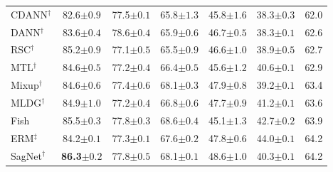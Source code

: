 \begin{table}
\begin{tabular}{l|ccccc|c}
CDANN$^\dagger$ \cite{li2018cdann}              & 82.6\scriptsize{$\pm0.9$}          & 77.5\scriptsize{$\pm0.1$}          & 65.8\scriptsize{$\pm1.3$}          & 45.8\scriptsize{$\pm1.6$}          & 38.3\scriptsize{$\pm0.3$}          & 62.0           \\
DANN$^\dagger$ \cite{ganin2016dann}             & 83.6\scriptsize{$\pm0.4$}          & 78.6\scriptsize{$\pm0.4$}          & 65.9\scriptsize{$\pm0.6$}          & 46.7\scriptsize{$\pm0.5$}          & 38.3\scriptsize{$\pm0.1$}          & 62.6           \\
RSC$^\dagger$ \cite{huang2020rsc}               & 85.2\scriptsize{$\pm0.9$}          & 77.1\scriptsize{$\pm0.5$}          & 65.5\scriptsize{$\pm0.9$}          & 46.6\scriptsize{$\pm1.0$}          & 38.9\scriptsize{$\pm0.5$}          & 62.7           \\
MTL$^\dagger$ \cite{blanchard2021mtl_marginal_transfer_learning}    & 84.6\scriptsize{$\pm0.5$}          & 77.2\scriptsize{$\pm0.4$}          & 66.4\scriptsize{$\pm0.5$}          & 45.6\scriptsize{$\pm1.2$}          & 40.6\scriptsize{$\pm0.1$}          & 62.9           \\
Mixup$^\dagger$ \cite{xu2020interdomain_mixup_aaai,yan2020interdomain_mixup,wang2020interdomain_mixup_icassp_dg}             & 84.6\scriptsize{$\pm0.6$}          & 77.4\scriptsize{$\pm0.6$}          & 68.1\scriptsize{$\pm0.3$}          & 47.9\scriptsize{$\pm0.8$}          & 39.2\scriptsize{$\pm0.1$}          & 63.4           \\
MLDG$^\dagger$ \cite{li2018mldg}                & 84.9\scriptsize{$\pm1.0$}          & 77.2\scriptsize{$\pm0.4$}          & 66.8\scriptsize{$\pm0.6$}          & 47.7\scriptsize{$\pm0.9$}          & 41.2\scriptsize{$\pm0.1$}          & 63.6           \\
Fish \cite{shi2022gradient}                     & 85.5\scriptsize{$\pm0.3$}          & 77.8\scriptsize{$\pm0.3$}          & 68.6\scriptsize{$\pm0.4$}          & 45.1\scriptsize{$\pm1.3$}          & 42.7\scriptsize{$\pm0.2$}          & 63.9           \\ 
ERM$^\ddagger$ \cite{vapnik1998statistical}     & 84.2\scriptsize{$\pm0.1$}          & 77.3\scriptsize{$\pm0.1$}          & 67.6\scriptsize{$\pm0.2$}          & 47.8\scriptsize{$\pm0.6$}          & 44.0\scriptsize{$\pm0.1$}          & 64.2           \\
SagNet$^\dagger$ \cite{nam2019sagnet}             & \textbf{86.3\scriptsize{$\pm0.2$}} & 77.8\scriptsize{$\pm0.5$}          & 68.1\scriptsize{$\pm0.1$}          & 48.6\scriptsize{$\pm1.0$}          & 40.3\scriptsize{$\pm0.1$}          & 64.2           \\

\end{tabular}
\end{table}
